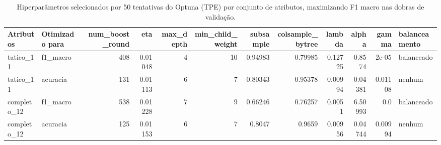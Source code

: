 \begin{table}[htbp]
\centering
\caption{Hiperparâmetros selecionados por 50 tentativas do Optuna (TPE) por conjunto de atributos, maximizando F1 macro nas dobras de validação.}
\label{tab:wp2-hiperparametros}
\small
\begin{tabular}{llrrrrrrrrrl}
\toprule
Atributos & Otimizado para & num\_boost\_round & eta & max\_depth & min\_child\_weight & subsample & colsample\_bytree & lambda & alpha & gamma & balanceamento \\
\midrule
tatico\_11 & f1\_macro & 408 & 0.01048 & 4 & 10 & 0.94983 & 0.79985 & 0.12725 & 0.8574 & 2e-05 & balanceado \\
tatico\_11 & acuracia & 131 & 0.01113 & 6 & 7 & 0.80343 & 0.95378 & 0.00994 & 0.04381 & 0.01108 & nenhum \\
completo\_12 & f1\_macro & 538 & 0.01228 & 7 & 9 & 0.66246 & 0.76257 & 0.0051 & 6.50993 & 0.0 & balanceado \\
completo\_12 & acuracia & 125 & 0.01153 & 6 & 7 & 0.8047 & 0.9659 & 0.00956 & 0.04744 & 0.00994 & nenhum \\
\bottomrule
\end{tabular}
\end{table}
